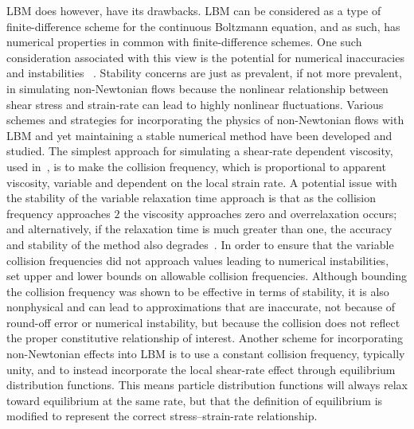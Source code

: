 \documentclass[pdftex,ms]{pittetd}
\begin{document}
LBM does however, have its drawbacks.
LBM can be considered as a type of finite-difference scheme for the continuous Boltzmann equation, and as such, has numerical properties in common with finite-difference schemes.
One such consideration associated with this view is the potential for numerical inaccuracies and instabilities ~\cite{sterling1993stability,sterling1996stability,bawazeer2013stability,lallemand2000theory}. %
Stability concerns are just as prevalent, if not more prevalent, in simulating non-Newtonian flows because the nonlinear relationship between shear stress and strain-rate can lead to highly nonlinear fluctuations. %
Various schemes and strategies for incorporating the physics of non-Newtonian flows with LBM and yet maintaining a stable numerical method have been developed and studied.
The simplest approach for simulating a shear-rate dependent viscosity, used in~\cite{boyd2006second,chen2014simulations,fallah2012multiple,tang2011bingham,svec2011flow,svec2012free,zhao2016lattice}, is to make the collision frequency, which is proportional to apparent viscosity, variable and dependent on the local strain rate.
A potential issue with the stability of the variable relaxation time approach is that as the collision frequency approaches $2$ the viscosity approaches zero and overrelaxation occurs; and alternatively, if the relaxation time is much greater than one, the accuracy and stability of the method also degrades~\cite{latt2007hydrodynamic}. %
In order to ensure that the variable collision frequencies did not approach values leading to numerical instabilities,~\cite{svec2011flow,svec2012free,gabbanelli2005lattice} set upper and lower bounds on allowable collision frequencies.
Although bounding the collision frequency was shown to be effective in terms of stability, it is also nonphysical and can lead to approximations that are inaccurate, not because of round-off error or numerical instability, but because the collision does not reflect the proper constitutive relationship of interest.
Another scheme for incorporating non-Newtonian effects into LBM is to use a constant collision frequency, typically unity, and to instead incorporate the local shear-rate effect through equilibrium distribution functions.
This means particle distribution functions will always relax toward equilibrium at the same rate, but that the definition of equilibrium is modified to represent the correct stress--strain-rate relationship.
\end{document}
